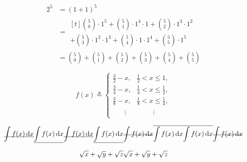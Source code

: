 \documentclass{ctexart}
\begin{document}
    \begin{align*}
    2^5 &= (1+1)^5 \\
    &= \begin{multlined}[t]
    \binom50\cdot 1^5 + \binom51\cdot 1^4 \cdot 1
      + \binom52\cdot 1^3 \cdot 1^2 \\
    + \binom53\cdot 1^2 \cdot 1^3 + \binom54\cdot 1 \cdot 1^4
      + \binom55\cdot 1^5
    \end{multlined} \\
    &= \binom50 + \binom51 + \binom52 + \binom53 + \binom54 + \binom55
    \end{align*}
\iffalse
\[
f(x) \triangleq \begin{dcases}
  \tfrac32 - x, & \tfrac12 < x \leq 1,\\
  \tfrac34 - x, & \tfrac14 < x \leq \tfrac12,\\
  \tfrac38 - x, & \tfrac18 < x \leq \tfrac14,\\
  \phantom{\tfrac38}\vdots & \phantom{\tfrac18 < x}\vdots
\end{dcases}
\]
\fi

\[
f(x) \triangleq \begin{cases}
  \frac32 - x, & \frac12 < x \leq 1,\\
  \frac34 - x, & \frac14 < x \leq \frac12,\\
  \frac38 - x, & \frac18 < x \leq \frac14,\\
  \phantom{\frac32 -}\!\!\!\vdots & \phantom{\frac18 < x}\!\!\!\vdots
\end{cases}
\]

\[
\underline{\smash{\int f(x)\,\mathrm{d}x}} \underline{\int f(x)\,\mathrm{d}x} \underline{\smash[b]{\int f(x)\,\mathrm{d}x}} \underline{\smash[t]{\int f(x)\,\mathrm{d}x}} \overline{\smash{\int f(x)\,\mathrm{d}x}} \overline{\int f(x)\,\mathrm{d}x} \overline{\smash[b]{\int f(x)\,\mathrm{d}x}} \overline{\smash[t]{\int f(x)\,\mathrm{d}x}}
\]

\[
\sqrt{x} + \sqrt{y} + \sqrt{z}  \sqrt{x} + \sqrt{\smash[b]{y}} + \sqrt{z}
\]
\end{document}
